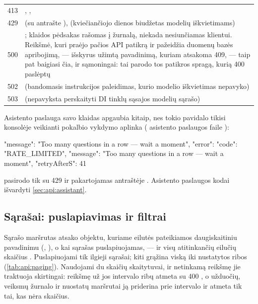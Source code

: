 \begin{table}[H]
\begin{tabularx}{\textwidth}{@{}L{12mm}Y@{}}
413 & , ,  \\
429 &  (su antrašte ), 
  (kviečiančiojo dienos biudžetas modelių iškvietimams) \\
500 & ; klaidos pėdsakas rašomas į žurnalą, niekada nesiunčiamas klientui.
  Reikšmė, kuri praėjo pačios API patikrą ir pažeidžia duomenų bazės apribojimą, --- išskyrus
  užimtą pavadinimą, kuriam atsakoma 409, --- taip pat baigiasi čia, ir sąmoningai: tai parodo
  tos patikros spragą, kurią 400 paslėptų \\
502 &  (bandomasis instrukcijos paleidimas, kurio modelio iškvietimas nepavyko) \\
503 &  (nepavyksta perskaityti DI tinklų sąsajos modelių sąrašo) \\
\bottomrule
\end{tabularx}
\end{table}

Asistento paslauga savo klaidas apgaubia kitaip, nes tokio pavidalo tikisi konsolėje veikianti
pokalbio vykdymo aplinka ( asistento paslaugos faile
):

\begin{codeblock}
{"message": "Too many questions in a row — wait a moment",
 "error": {"code": "RATE_LIMITED", "message": "Too many questions in a row — wait a moment", "retryAfterS": 41}}
\end{codeblock}

 pasirodo tik su 429 ir pakartojamas antraštėje . Asistento
paslaugos kodai išvardyti \cref{sec:api:assistant}.

\subsection{Sąrašai: puslapiavimas ir filtrai}\label{sec:api:paging}

Sąrašo maršrutas atsako objektu, kuriame eilutės pateikiamos daugiskaitiniu pavadinimu
(, ), o kai sąrašas puslapiuojamas, --- ir visų atitinkančių eilučių
skaičius . Puslapiuojami tik ilgieji sąrašai; kiti grąžina viską iki nustatytos ribos
(\cref{tab:api:paging}). Naudojami du skaičių skaitytuvai, ir netinkamą reikšmę jie traktuoja
skirtingai:  reikšmę už jos intervalo ribų atmeta su 400 , o
užduočių, veiksmų žurnalo ir nuostatų maršrutai ją priderina prie intervalo ir atmeta tik tai, kas
nėra skaičius.

